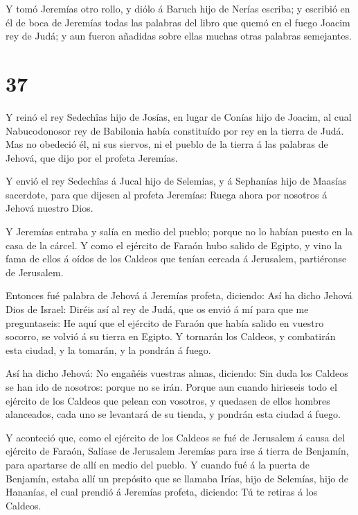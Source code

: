  Y tomó Jeremías otro rollo, y diólo á Baruch hijo de
Nerías escriba; y escribió en él de boca de Jeremías todas las palabras
del libro que quemó en el fuego Joacim rey de Judá; y aun fueron
añadidas sobre ellas muchas otras palabras semejantes.

\hypertarget{section-36}{%
\section{37}\label{section-36}}

 Y reinó el rey Sedechîas hijo de Josías, en lugar de Conías
hijo de Joacim, al cual Nabucodonosor rey de Babilonia había constituído
por rey en la tierra de Judá.  Mas no obedeció él, ni sus
siervos, ni el pueblo de la tierra á las palabras de Jehová, que dijo
por el profeta Jeremías.

 Y envió el rey Sedechîas á Jucal hijo de Selemías, y á
Sephanías hijo de Maasías sacerdote, para que dijesen al profeta
Jeremías: Ruega ahora por nosotros á Jehová nuestro Dios.

 Y Jeremías entraba y salía en medio del pueblo; porque no
lo habían puesto en la casa de la cárcel.  Y como el
ejército de Faraón hubo salido de Egipto, y vino la fama de ellos á
oídos de los Caldeos que tenían cercada á Jerusalem, partiéronse de
Jerusalem.

 Entonces fué palabra de Jehová á Jeremías profeta,
diciendo:  Así ha dicho Jehová Dios de Israel: Diréis así al
rey de Judá, que os envió á mí para que me preguntaseis: He aquí que el
ejército de Faraón que había salido en vuestro socorro, se volvió á su
tierra en Egipto.  Y tornarán los Caldeos, y combatirán esta
ciudad, y la tomarán, y la pondrán á fuego.

 Así ha dicho Jehová: No engañéis vuestras almas, diciendo:
Sin duda los Caldeos se han ido de nosotros: porque no se irán.
 Porque aun cuando hirieseis todo el ejército de los
Caldeos que pelean con vosotros, y quedasen de ellos hombres alanceados,
cada uno se levantará de su tienda, y pondrán esta ciudad á fuego.

 Y aconteció que, como el ejército de los Caldeos se fué de
Jerusalem á causa del ejército de Faraón,  Salíase de
Jerusalem Jeremías para irse á tierra de Benjamín, para apartarse de
allí en medio del pueblo.  Y cuando fué á la puerta de
Benjamín, estaba allí un prepósito que se llamaba Irías, hijo de
Selemías, hijo de Hananías, el cual prendió á Jeremías profeta,
diciendo: Tú te retiras á los Caldeos.

